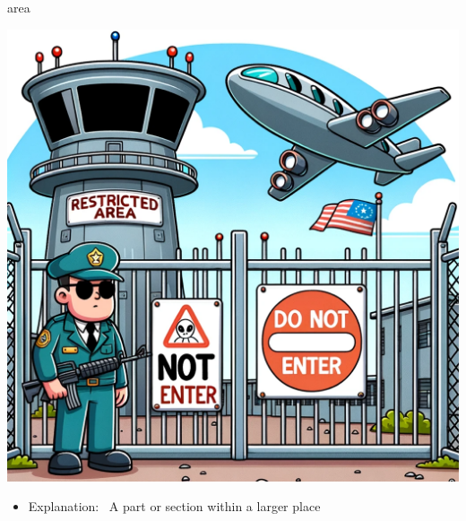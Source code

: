 \documentclass[avery5371, grid,frame]{flashcards}
\begin{document}
\renewcommand{\cardpaper}{a4paper}
\renewcommand{\cardpapermode}{landscape}
\renewcommand{\cardrows}{2}
\renewcommand{\cardcolumns}{2}
\setlength{\cardheight}{3.5in}
\setlength{\cardwidth}{5.0in}
\setlength{\topoffset}{0.50in}
\setlength{\oddoffset}{0.50in}
\setlength{\evenoffset}{0.50in}

\begin{flashcard}{area}
    \vspace*{\fill}
    \begin{center}
        \begin{minipage}[c]{.45\textwidth}
            \includegraphics[width=\textwidth]{cards/a/area/area - a restricted zone with a 'Do Not Enter' sign and a guarded gate.png}
        \end{minipage}
        \begin{minipage}[c]{.45\textwidth}
            \begin{itemize}\setlength\itemsep{12pt}
            \item Explanation: \ A part or section within a larger place


\end{itemize}
\end{minipage}
\end{center}
\end{flashcard}
\end{document}
